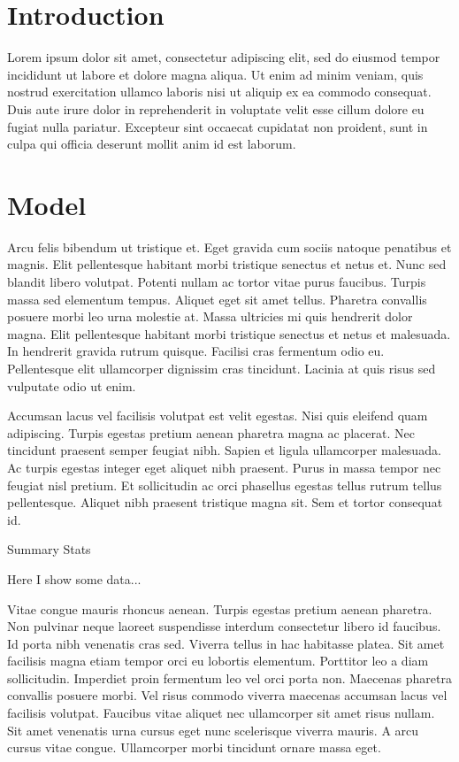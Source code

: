 \section{Introduction}

Lorem ipsum dolor sit amet, consectetur adipiscing elit, sed do eiusmod tempor
incididunt ut labore et dolore magna aliqua. Ut enim ad minim veniam, quis
nostrud exercitation ullamco laboris nisi ut aliquip ex ea commodo consequat.
Duis aute irure dolor in reprehenderit in voluptate velit esse cillum dolore
eu fugiat nulla pariatur. Excepteur sint occaecat cupidatat non proident,
sunt in culpa qui officia deserunt mollit anim id est laborum.


\section{Model}

Arcu felis bibendum ut tristique et. Eget gravida cum sociis natoque penatibus
et magnis. Elit pellentesque habitant morbi tristique senectus et netus et.
Nunc sed blandit libero volutpat. Potenti nullam ac tortor vitae purus
faucibus. Turpis massa sed elementum tempus. Aliquet eget sit amet tellus.
Pharetra convallis posuere morbi leo urna molestie at. Massa ultricies mi
quis hendrerit dolor magna. Elit pellentesque habitant morbi tristique
senectus et netus et malesuada. In hendrerit gravida rutrum quisque. Facilisi
cras fermentum odio eu. Pellentesque elit ullamcorper dignissim cras
tincidunt. Lacinia at quis risus sed vulputate odio ut enim.

Accumsan lacus vel facilisis volutpat est velit egestas. Nisi quis eleifend
quam adipiscing. Turpis egestas pretium aenean pharetra magna ac placerat.
Nec tincidunt praesent semper feugiat nibh. Sapien et ligula ullamcorper
malesuada. Ac turpis egestas integer eget aliquet nibh praesent. Purus in
massa tempor nec feugiat nisl pretium. Et sollicitudin ac orci phasellus
egestas tellus rutrum tellus pellentesque. Aliquet nibh praesent tristique
magna sit. Sem et tortor consequat id.

\begin{table}
\caption{Summary Stats}
\centering

\caption*{
  Here I show some data...
}
\label{table:example_table.tex}
\end{table}

Vitae congue mauris rhoncus aenean. Turpis egestas pretium aenean pharetra.
Non pulvinar neque laoreet suspendisse interdum consectetur libero id
faucibus. Id porta nibh venenatis cras sed. Viverra tellus in hac habitasse
platea. Sit amet facilisis magna etiam tempor orci eu lobortis elementum.
Porttitor leo a diam sollicitudin. Imperdiet proin fermentum leo vel orci
porta non. Maecenas pharetra convallis posuere morbi. Vel risus commodo
viverra maecenas accumsan lacus vel facilisis volutpat. Faucibus vitae
aliquet nec ullamcorper sit amet risus nullam. Sit amet venenatis urna cursus
eget nunc scelerisque viverra mauris. A arcu cursus vitae congue. Ullamcorper
morbi tincidunt ornare massa eget.

